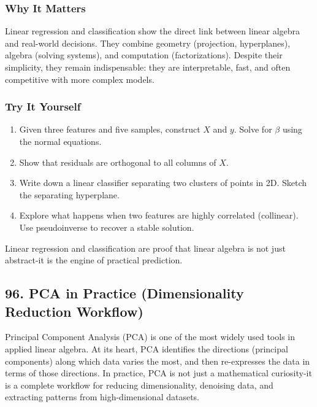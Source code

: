 \documentclass[
  letterpaper,
  DIV=11,
  numbers=noendperiod]{scrreprt}
\providecommand{\tightlist}{%
  \setlength{\itemsep}{0pt}\setlength{\parskip}{0pt}}
\begin{document}
\subsubsection{Why It Matters}\label{why-it-matters-90}

Linear regression and classification show the direct link between linear
algebra and real-world decisions. They combine geometry (projection,
hyperplanes), algebra (solving systems), and computation
(factorizations). Despite their simplicity, they remain indispensable:
they are interpretable, fast, and often competitive with more complex
models.

\subsubsection{Try It Yourself}\label{try-it-yourself-94}

\begin{enumerate}
\def\labelenumi{\arabic{enumi}.}
\tightlist
\item
  Given three features and five samples, construct \(X\) and \(y\).
  Solve for \(\beta\) using the normal equations.
\item
  Show that residuals are orthogonal to all columns of \(X\).
\item
  Write down a linear classifier separating two clusters of points in
  2D. Sketch the separating hyperplane.
\item
  Explore what happens when two features are highly correlated
  (collinear). Use pseudoinverse to recover a stable solution.
\end{enumerate}

Linear regression and classification are proof that linear algebra is
not just abstract-it is the engine of practical prediction.

\subsection{96. PCA in Practice (Dimensionality Reduction
Workflow)}\label{pca-in-practice-dimensionality-reduction-workflow}

Principal Component Analysis (PCA) is one of the most widely used tools
in applied linear algebra. At its heart, PCA identifies the directions
(principal components) along which data varies the most, and then
re-expresses the data in terms of those directions. In practice, PCA is
not just a mathematical curiosity-it is a complete workflow for reducing
dimensionality, denoising data, and extracting patterns from
high-dimensional datasets.
\end{document}

